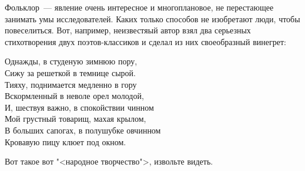 \documentclass[12pt]{article}
\begin{document}
Фольклор~--- явление очень интересное и многоплановое, не
перестающее занимать умы исследователей. Каких только
способов не изобретают люди, чтобы повеселиться. Вот,
например, неизвестяый автор взял два серьезных стихотворения
двух поэтов-классиков и сделал из них своеобразный винегрет:

\bigskip
\noindent Однажды, в студеную зимнюю пору, \\
Сижу за решеткой в темнице сырой.\\
Тияху, поднимается медленно в гору\\
Вскормленный в неволе орел молодой,\\
И, шествуя важно, в спокойствии чинном\\
Мой грустный товарищ, махая крылом,\\
В больших сапогах, в полушубке овчинном\\
Кровавую пицу клюет под окном.
\bigskip

Вот такое вот "<народное творчество">, извольте видеть.\\\\


\end{document}
